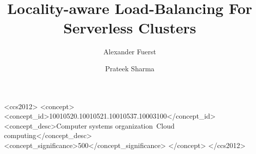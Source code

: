 \documentclass[sigconf]{acmart}
\begin{document}
\fancyhead{}
\date{}

\title{Locality-aware Load-Balancing For Serverless Clusters}

\author{Alexander Fuerst}

\author{Prateek Sharma}

\begin{CCSXML}
  <ccs2012>
  <concept>
  <concept_id>10010520.10010521.10010537.10003100</concept_id>
  <concept_desc>Computer systems organization~Cloud computing</concept_desc>
  <concept_significance>500</concept_significance>
  </concept>
  </ccs2012>
\end{CCSXML}
  

\begin{abstract}
  
\end{abstract}

\maketitle

















{


%
}
\end{document}
